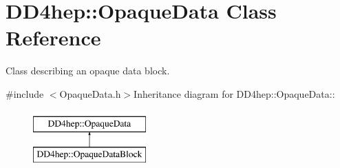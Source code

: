 \hypertarget{class_d_d4hep_1_1_opaque_data}{
\section{DD4hep::OpaqueData Class Reference}
\label{class_d_d4hep_1_1_opaque_data}
}


Class describing an opaque data block.  


{\ttfamily \#include $<$OpaqueData.h$>$}Inheritance diagram for DD4hep::OpaqueData::\begin{figure}[H]
\begin{center}
\leavevmode
\includegraphics[height=2cm]{class_d_d4hep_1_1_opaque_data}
\end{center}
\end{figure}
